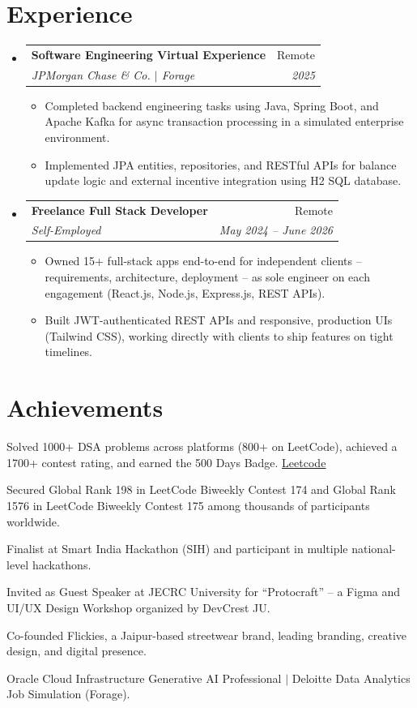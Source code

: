 \documentclass[letterpaper,11pt]{article}
\makeatletter
\newcommand{\resumeItem}[1]{
  \item\small{
    {#1 \vspace{-4pt}}
  }
}
\newcommand{\resumeSubheading}[4]{
  \vspace{-2pt}\item
    \begin{tabular*}{0.97\textwidth}[t]{l@{\extracolsep{\fill}}r}
      \textbf{#1} & #2 \\
      \textit{\small#3} & \textit{\small #4} \\
    \end{tabular*}\vspace{-9pt}
}
\newcommand{\resumeSubHeadingListStart}{\begin{itemize}[leftmargin=0.15in, label={}]}
\newcommand{\resumeSubHeadingListEnd}{\end{itemize}}
\newcommand{\resumeItemListStart}{\begin{itemize}[label=$\vcenter{\hbox{\tiny$\bullet$}}$]}
\newcommand{\resumeItemListEnd}{\end{itemize}\vspace{-7pt}}
\makeatother
\begin{document}
\section{Experience}
\resumeSubHeadingListStart

\resumeSubheading
  {Software Engineering Virtual Experience}{Remote}
  {JPMorgan Chase \& Co. $|$ Forage}{2025}
  \resumeItemListStart
\resumeItem{Completed backend engineering tasks using Java, Spring Boot, and Apache Kafka for async transaction processing in a simulated enterprise environment.}
\resumeItem{Implemented JPA entities, repositories, and RESTful APIs for balance update logic and external incentive integration using H2 SQL database.}
  \resumeItemListEnd

\resumeSubheading
  {Freelance Full Stack Developer}{Remote}
  {Self-Employed}{May 2024 -- June 2026}
  \resumeItemListStart
    \resumeItem{Owned 15+ full-stack apps end-to-end for independent clients -- requirements, architecture, deployment -- as sole engineer on each engagement (React.js, Node.js, Express.js, REST APIs).}
    \resumeItem{Built JWT-authenticated REST APIs and responsive, production UIs (Tailwind CSS), working directly with clients to ship features on tight timelines.}
  \resumeItemListEnd

\resumeSubHeadingListEnd


\section{Achievements}
\vspace{-2pt}
\begin{itemize}[leftmargin=0.15in, label=$\vcenter{\hbox{\tiny$\bullet$}}$, itemsep=-4pt, topsep=0pt]
  \small{
 \item{Solved 1000+ DSA problems across platforms (800+ on LeetCode), achieved a 1700+ contest rating, and earned the 500 Days Badge. \hfill \href{https://leetcode.com/u/mannsvijay/}{\underline{Leetcode}}}
  
  \item{Secured Global Rank 198 in LeetCode Biweekly Contest 174 and Global Rank 1576 in LeetCode Biweekly Contest 175 among thousands of participants worldwide.}
  
  \item{Finalist at Smart India Hackathon (SIH) and participant in multiple national-level hackathons.}
  
  \item{Invited as Guest Speaker at JECRC University for ``Protocraft'' -- a Figma and UI/UX Design Workshop organized by DevCrest JU.}
  
  \item{Co-founded Flickies, a Jaipur-based streetwear brand, leading branding, creative design, and digital presence.}
  
  \item{Oracle Cloud Infrastructure Generative AI Professional $|$  Deloitte Data Analytics Job Simulation (Forage).}
  }
\end{itemize}

\end{document}
